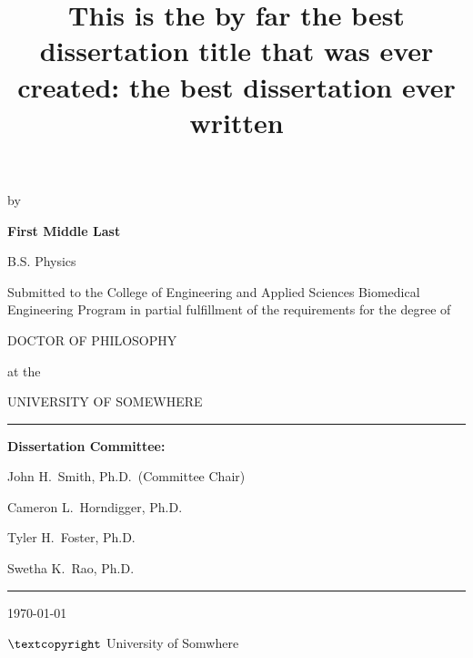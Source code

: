 \documentclass[12pt]{report}
\title{This is the by far the best dissertation title that was ever created:  the best dissertation ever written}
\makeatletter
\let\theTitle\@title
\makeatother
\begin{document}
\thispagestyle{empty}
\begin{center}
	\begin{minipage}{1.\linewidth}
		\centering
		\onehalfspacing{\huge \selectfont{\theTitle}\par}
		\vspace{.1cm}
		{\Large by \par}
		{\Large \textbf{First Middle  Last} \par}
		{\large B.S. Physics \par}
		\vspace{.5cm}
		\onehalfspacing
		{ \large
			Submitted to the College of Engineering and Applied Sciences
			Biomedical Engineering Program
			in partial fulfillment of the requirements for the degree of \par
			\uppercase{Doctor of Philosophy}  
			\par 
			at the \par
			\uppercase{University of Somewhere}\par}		
		\vspace{.5cm}
		\rule{\textwidth}{1pt}
		
		{\large
			\textbf{Dissertation Committee:} \par
			John H.\ Smith, Ph.D.\ (Committee Chair)\par
			\vspace{-.5em}{\small Dept.\ of Biomedical, Chemical, and Environmental Engineering}\par
			Cameron L.\ Horndigger, Ph.D.\ \par 
			\vspace{-.5em}{\small Dept.\ of Internal Medicine \& Biomedical Engineering Program} \par 
			Tyler H.\ Foster, Ph.D.\ \par 
			\vspace{-.5em}{\small Dept.\ of Internal Medicine \& Biomedical Engineering Program} \par 
			Swetha K.\ Rao, Ph.D.\ \par 
			\vspace{-.5em}{\small Dept.\ of Environmental Health \& Biomedical Engineering Program} \par 
		}
		\rule{\textwidth}{.85pt}
		\vspace{.65cm}
		
		{\large \today \par}
		\vspace{0.25cm}
		{ $\textcopyright$ University of Somwhere}
		
	\end{minipage}
\end{center}

\clearpage
\end{document}
